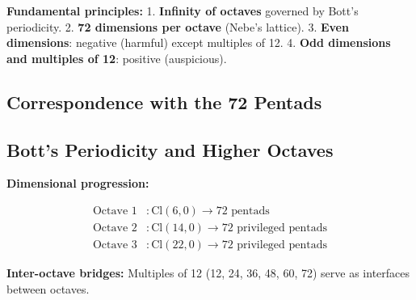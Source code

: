\documentclass[11pt]{article}
\begin{document}
\textbf{Fundamental principles:} 1. \textbf{Infinity of octaves}
governed by Bott's periodicity. 2. \textbf{72 dimensions per octave}
(Nebe's lattice). 3. \textbf{Even dimensions}: negative (harmful) except
multiples of 12. 4. \textbf{Odd dimensions and multiples of 12}:
positive (auspicious).

\hypertarget{correspondence-with-the-72-pentads}{%
\subsection{Correspondence with the 72
Pentads}\label{correspondence-with-the-72-pentads}}

\begin{center}
\end{center}

\hypertarget{botts-periodicity-and-higher-octaves}{%
\subsection{Bott's Periodicity and Higher
Octaves}\label{botts-periodicity-and-higher-octaves}}

\textbf{Dimensional progression:}

\begin{align*}
\text{Octave 1} &: \text{Cl}(6,0) \rightarrow 72 \text{ pentads} \\
\text{Octave 2} &: \text{Cl}(14,0) \rightarrow 72 \text{ privileged pentads} \\
\text{Octave 3} &: \text{Cl}(22,0) \rightarrow 72 \text{ privileged pentads}
\end{align*}

\textbf{Inter-octave bridges:} Multiples of 12 (12, 24, 36, 48, 60, 72)
serve as interfaces between octaves.
\end{document}
